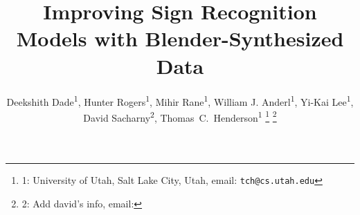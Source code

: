 \documentclass[journal]{IEEEtran}
\begin{document}
%
\title{Improving Sign Recognition Models with Blender-Synthesized Data}
%
%
%

\author{
    Deekshith Dade\textsuperscript{1},
    Hunter Rogers\textsuperscript{1},
    Mihir Rane\textsuperscript{1},
    William J. Anderl\textsuperscript{1},
    Yi-Kai Lee\textsuperscript{1},
    David Sacharny\textsuperscript{2},
    Thomas~C.~Henderson\textsuperscript{1}
    \thanks{1: University of Utah, Salt Lake City, Utah, email: \tt\small tch@cs.utah.edu}
    \thanks{2: Add david's info, email: }
}



% 
%



% 
\end{document}
